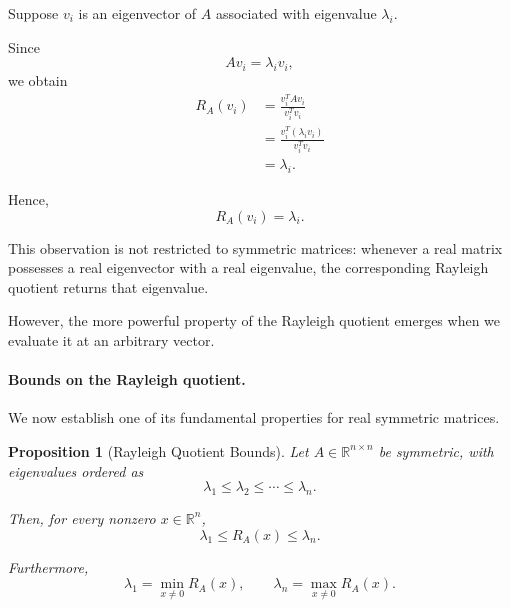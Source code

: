 \documentclass[14pt,letterpaper]{article}
\theoremstyle{plain}
\newtheorem{proposition}[theorem]{Proposition}
\theoremstyle{definition}
\theoremstyle{remark}
\newcommand{\R}{\mathbb{R}}
\begin{document}
Suppose $v_i$ is an eigenvector of $A$
associated with eigenvalue $\lambda_i$.

Since
\[
Av_i=\lambda_i v_i,
\]
we obtain
\[
\begin{aligned}
R_A(v_i)
&=\frac{v_i^TAv_i}{v_i^Tv_i}\\[4pt]
&=\frac{v_i^T(\lambda_i v_i)}{v_i^Tv_i}\\[4pt]
&=\lambda_i.
\end{aligned}
\]

Hence,
\[
\boxed{
R_A(v_i)=\lambda_i.
}
\]

This observation is not restricted to
symmetric matrices: whenever a real
matrix possesses a real eigenvector
with a real eigenvalue, the corresponding
Rayleigh quotient returns that eigenvalue.

However, the more powerful property of
the Rayleigh quotient emerges when
we evaluate it at an arbitrary vector.


\paragraph{Bounds on the Rayleigh quotient.}

We now establish one of its fundamental
properties for real symmetric matrices.

\begin{proposition}[Rayleigh Quotient Bounds]
Let $A\in\R^{n\times n}$ be symmetric,
with eigenvalues ordered as
\[
\lambda_1\leq\lambda_2\leq\cdots\leq\lambda_n.
\]

Then, for every nonzero $x\in\R^n$,
\[
\boxed{
\lambda_1
\leq
R_A(x)
\leq
\lambda_n.
}
\]

Furthermore,
\[
\boxed{
\lambda_1=\min_{x\neq0}R_A(x),
\qquad
\lambda_n=\max_{x\neq0}R_A(x).
}
\]
\end{proposition}
\end{document}
